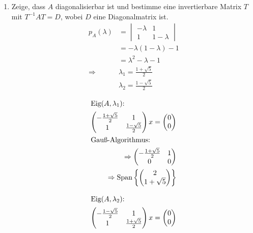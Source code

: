 \documentclass{HM}
\newcommand{\Eig}{\text{Eig}}
\newcommand{\Span}{\text{Span}}
\begin{document}
\begin{enumerate}
\begin{enumerate}
		\item Zeige, dass $A$ diagonalisierbar ist und bestimme eine invertierbare Matrix $T$ mit $T^{-1}AT=D$, wobei $D$ eine Diagonalmatrix ist.\\
		\begin{align*}
			p_A(\lambda)&=\begin{vmatrix}
				-\lambda&1\\
				1&1-\lambda
			\end{vmatrix}\\
			&=-\lambda(1-\lambda)-1\\
			&=\lambda^2-\lambda-1\\
			\Rightarrow &\lambda_1 = \frac{1+\sqrt{5}}{2}\\
			&\lambda_2 = \frac{1-\sqrt{5}}{2}
		\end{align*}
		\begin{minipage}{.5\textwidth}
			\begin{align*}
			\intertext{$\Eig(A, \lambda_1)$:}
			\begin{pmatrix}
				-\frac{1+\sqrt{5}}{2}&1\\
				1&\frac{1-\sqrt{5}}{2}
			\end{pmatrix}x=\begin{pmatrix}
				0\\0
			\end{pmatrix}\\
			\intertext{Gauß-Algorithmus:}
			\Rightarrow\begin{pmatrix}
				-\frac{1+\sqrt{5}}{2}&1\\
				0&0
			\end{pmatrix}\\
			\Rightarrow\Span\left\lbrace\begin{pmatrix}
				2\\
				1+\sqrt{5}
			\end{pmatrix}\right\rbrace
			\end{align*}
		\end{minipage}
		\begin{minipage}{.5\textwidth}
			\begin{align*}
			\intertext{$\Eig(A, \lambda_2)$:}
			\begin{pmatrix}
				-\frac{1-\sqrt{5}}{2}&1\\
				1&\frac{1+\sqrt{5}}{2}
			\end{pmatrix}x=\begin{pmatrix}
				0\\0
			\end{pmatrix}\\

\end{align*}
\end{minipage}
\end{enumerate}
\end{enumerate}
\end{document}
